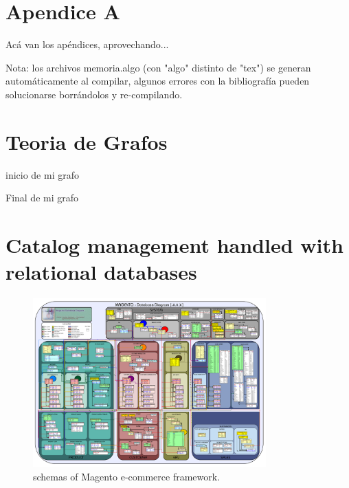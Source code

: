 
\appendix
\newpage
\chapter{Apendice A}
\label{Apendice A}
Acá van los apéndices, aprovechando...

Nota: los archivos memoria.algo (con "algo" distinto de "tex") se generan automáticamente al compilar, algunos errores con la bibliografía pueden solucionarse borrándolos y re-compilando.

\chapter{Teoria de Grafos}\label{ap:apendice_graph_theory}
inicio de mi grafo \cite{book_introduction_graph_theory}

Final de mi grafo

\chapter{Catalog management handled with relational databases}\label{ap:apendice_ecommerce_catalog_relational}

\begin{figure}[h!]
	\centering
	\includegraphics[width=0.8\textwidth]{figuras/apendice/magento_sample_database_diagram.png}
	\caption{schemas of Magento e-commerce framework.}
	\label{ap:figure:catalog_magento}
\end{figure}

